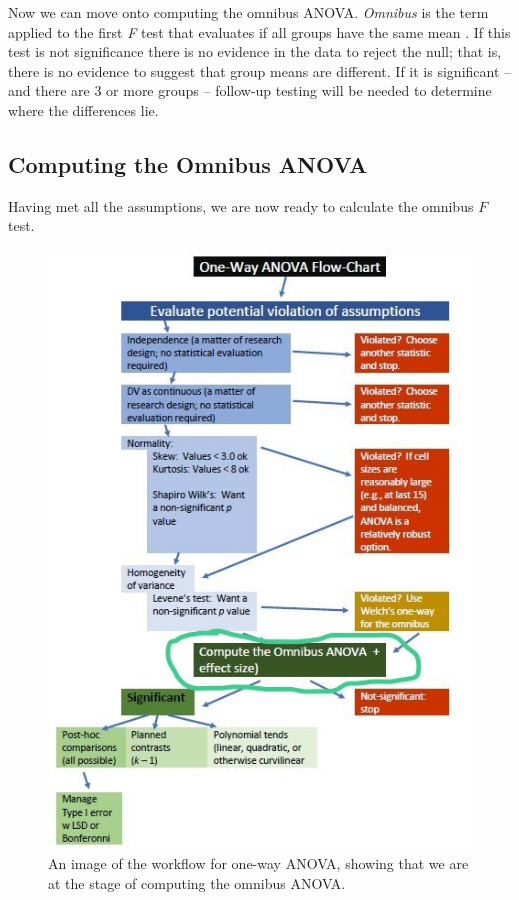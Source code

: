 \documentclass[
  english,
]{book}
\begin{document}
Now we can move onto computing the omnibus ANOVA. \emph{Omnibus} is the term applied to the first \emph{F} test that evaluates if all groups have the same mean \citep{chen_relationship_2018}. If this test is not significance there is no evidence in the data to reject the null; that is, there is no evidence to suggest that group means are different. If it is significant -- and there are 3 or more groups -- follow-up testing will be needed to determine where the differences lie.

\hypertarget{computing-the-omnibus-anova}{%
\subsection{Computing the Omnibus ANOVA}\label{computing-the-omnibus-anova}}

Having met all the assumptions, we are now ready to calculate the omnibus \(F\) test.

\begin{figure}
\centering
\includegraphics{images/OnewayWrkFlw_omnibus.jpg}
\caption{An image of the workflow for one-way ANOVA, showing that we are at the stage of computing the omnibus ANOVA.}
\end{figure}
\end{document}
